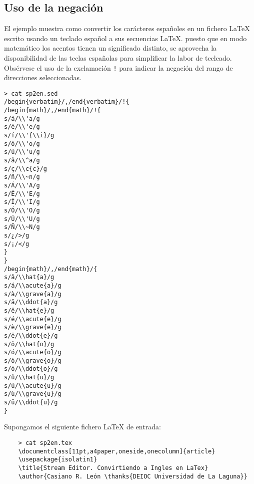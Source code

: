 \begin{latexonly}
\section{Uso de la negación}
El ejemplo muestra como convertir los carácteres españoles en
un fichero \LaTeX{} escrito usando un teclado español a sus secuencias \LaTeX.
puesto que en modo matemático los acentos tienen un significado distinto,
se aprovecha la disponibilidad de las teclas españolas para simplificar 
la labor de tecleado. Obsérvese el uso de la exclamación {\tt !} para indicar
la negación del rango de direcciones seleccionadas.

\begin{verbatim}
> cat sp2en.sed
/begin{verbatim}/,/end{verbatim}/!{
/begin{math}/,/end{math}/!{
s/á/\\'a/g
s/é/\\'e/g
s/í/\\'{\\i}/g
s/ó/\\'o/g
s/ú/\\'u/g
s/â/\\^a/g
s/ç/\\c{c}/g
s/ñ/\\~n/g
s/Á/\\'A/g
s/É/\\'E/g
s/Í/\\'I/g
s/Ó/\\'O/g
s/Ú/\\'U/g
s/Ñ/\\~N/g
s/¿/>/g
s/¡/</g
}
}
/begin{math}/,/end{math}/{
s/â/\\hat{a}/g
s/á/\\acute{a}/g
s/à/\\grave{a}/g
s/ä/\\ddot{a}/g
s/ê/\\hat{e}/g
s/é/\\acute{e}/g
s/è/\\grave{e}/g
s/ë/\\ddot{e}/g
s/ô/\\hat{o}/g
s/ó/\\acute{o}/g
s/ò/\\grave{o}/g
s/ö/\\ddot{o}/g
s/û/\\hat{u}/g
s/ú/\\acute{u}/g
s/ù/\\grave{u}/g
s/ü/\\ddot{u}/g
}                           
\end{verbatim}
Supongamos el siguiente fichero \LaTeX{} de entrada:
\begin{verbatim}
	> cat sp2en.tex
	\documentclass[11pt,a4paper,oneside,onecolumn]{article}
	\usepackage{isolatin1}
	\title{Stream Editor. Convirtiendo a Ingles en LaTex}
	\author{Casiano R. León \thanks{DEIOC Universidad de La Laguna}}
	

\end{verbatim}
\end{latexonly}
